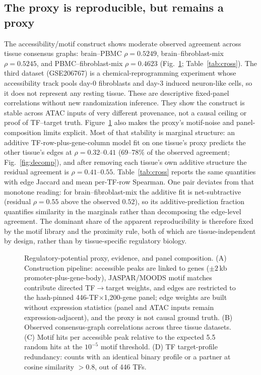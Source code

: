 \documentclass[fleqn,10pt,lineno]{wlpeerj}
\newcommand{\fitfig}[1]{\resizebox{\ifdim\width>\linewidth\linewidth\else\width\fi}{!}{#1}}
\begin{document}
\subsection{The proxy is reproducible, but remains a proxy}
The accessibility/motif construct shows moderate observed agreement across tissue consensus graphs:
brain--PBMC $\rho=0.5249$, brain--fibroblast-mix $\rho=0.5245$, and PBMC--fibroblast-mix
$\rho=0.4623$ (Fig.~\ref{fig:proxy}; Table~\ref{tab:cross}). The third dataset (GSE206767) is a
chemical-reprogramming experiment whose accessibility track pools day-0 fibroblasts and day-3
induced neuron-like cells, so it does not represent any resting tissue. These are descriptive
fixed-panel correlations without new randomization inference. They show the construct is stable
across ATAC inputs of very different provenance, not a causal ceiling or
proof of TF--target truth. Figure~\ref{fig:proxy} also makes the proxy's motif-noise and panel-
composition limits explicit. Most of that stability is marginal structure: an additive
TF-row-plus-gene-column model fit on one tissue's proxy predicts the other tissue's edges at
$\rho=0.32$--$0.41$ (69--78\% of the observed agreement; Fig.~\ref{fig:decomp}), and after removing each tissue's own
additive structure the residual agreement is $\rho=0.41$--$0.55$.
Table~\ref{tab:cross} reports the same quantities with edge Jaccard and mean per-TF-row Spearman.
One pair deviates from that
monotone reading: for brain--fibroblast-mix the additive fit is net-subtractive (residual
$\rho=0.55$ above the observed $0.52$), so its additive-prediction fraction quantifies similarity
in the marginals rather than decomposing the edge-level agreement. The dominant share of the
apparent reproducibility is therefore fixed by the motif library and the proximity rule, both of
which are tissue-independent by design, rather than by tissue-specific regulatory biology.

\begin{figure}[!tbp]\centering
\fitfig{}
\caption{Regulatory-potential proxy, evidence, and panel composition. (A) Construction pipeline:
accessible peaks are linked to genes ($\pm2$\,kb promoter-plus-gene-body), JASPAR/MOODS motif
matches contribute directed TF$\rightarrow$target weights, and edges are restricted to the
hash-pinned 446-TF$\times$1{,}200-gene panel; edge weights are built without expression statistics
(panel and ATAC inputs remain expression-adjacent), and the proxy is not causal ground truth.
(B) Observed consensus-graph correlations across three tissue datasets.
(C) Motif hits per accessible peak relative to the expected 5.5 random hits at the $10^{-5}$
motif threshold. (D) TF target-profile redundancy: counts with an identical binary profile or a
partner at cosine similarity $>0.8$, out of 446 TFs.}\label{fig:proxy}
\end{figure}
\end{document}
